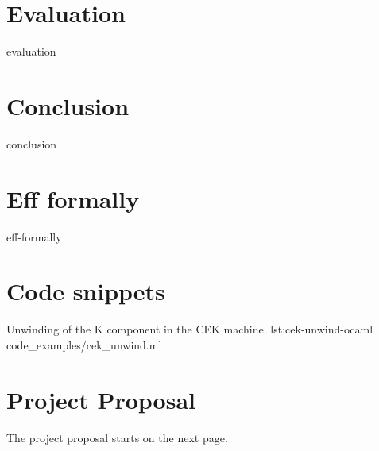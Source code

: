 \documentclass[%
    12pt,
    a4paper,
    bibliography=toc,
    listof=leveldown,%
    oneside
]{book}
\begin{document}
\chapter{Evaluation}
{evaluation}

\chapter{Conclusion}
{conclusion}

{}


\appendix

\begin{appendices}
\renewcommand{\thepage}{\thechapter.\arabic{page}}

\chapter{Eff formally}
\setcounter{page}{1}
{eff-formally}

\chapter{Code snippets}
\label{sec:code-snippets}
\setcounter{page}{1}

{Unwinding of the K component in the CEK machine.}
{lst:cek-unwind-ocaml}
{code_examples/cek_unwind.ml}

\chapter{Project Proposal}
\setcounter{page}{1}
The project proposal starts on the next page.


\end{appendices}
\end{document}

